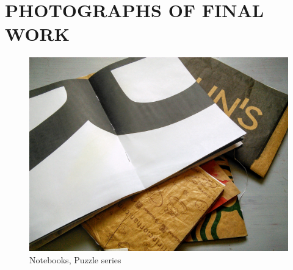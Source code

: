 \chapter{PHOTOGRAPHS OF FINAL WORK}

\begin{figure}[h!]
  \centering
  \includegraphics[width=\textwidth]{project_graphics/notebooks_puzzle_open.jpg}
  \caption{Notebooks, Puzzle series}
  \label{fig:NotebooksPuzzle}
\end{figure}


